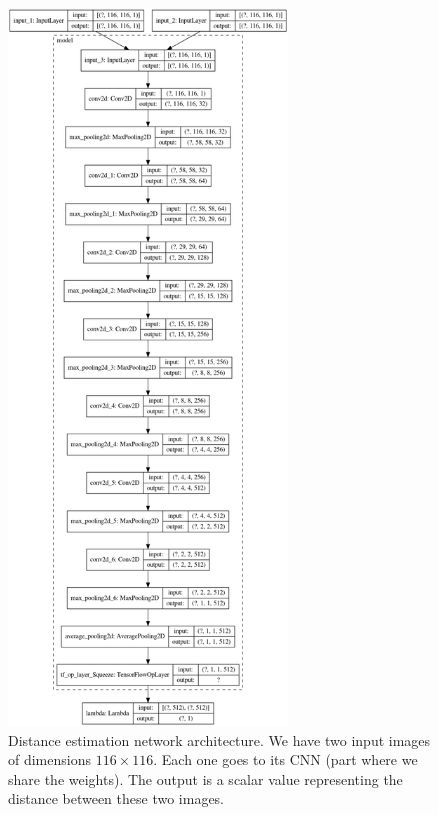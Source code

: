 \begin{figure}[h!]
    \centering
    \includegraphics[height=19cm]{images/model_plot.png}
    \caption{%
        Distance estimation network architecture.
        We have two input images of dimensions $116 \times 116$.
        Each one goes to its CNN (part where we share the weights).
        The output is a scalar value representing the distance between these two images.
    }\label{fig:de-architecture}
\end{figure}
